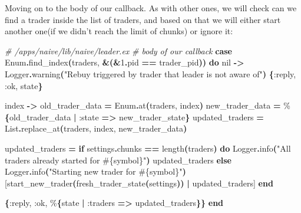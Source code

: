 \documentclass[
  oneside]{book}
\newenvironment{Shaded}{\begin{snugshade}}{\end{snugshade}}
\newcommand{\CommentTok}[1]{\textcolor[rgb]{0.56,0.35,0.01}{\textit{#1}}}
\newcommand{\ConstantTok}[1]{\textcolor[rgb]{0.56,0.35,0.01}{#1}}
\newcommand{\ControlFlowTok}[1]{\textcolor[rgb]{0.13,0.29,0.53}{\textbf{#1}}}
\newcommand{\DecValTok}[1]{\textcolor[rgb]{0.00,0.00,0.81}{#1}}
\newcommand{\FunctionTok}[1]{\textcolor[rgb]{0.13,0.29,0.53}{\textbf{#1}}}
\newcommand{\KeywordTok}[1]{\textcolor[rgb]{0.13,0.29,0.53}{\textbf{#1}}}
\newcommand{\NormalTok}[1]{#1}
\newcommand{\OperatorTok}[1]{\textcolor[rgb]{0.81,0.36,0.00}{\textbf{#1}}}
\newcommand{\OtherTok}[1]{\textcolor[rgb]{0.56,0.35,0.01}{#1}}
\newcommand{\StringTok}[1]{\textcolor[rgb]{0.31,0.60,0.02}{#1}}
\newcommand{\VariableTok}[1]{\textcolor[rgb]{0.00,0.00,0.00}{#1}}
\begin{document}
Moving on to the body of our callback. As with other ones, we will check can we find a trader inside the list of traders, and based on that we will either start another one(if we didn't reach the limit of chunks) or ignore it:

\begin{Shaded}
\begin{Highlighting}[]
    \CommentTok{\# /apps/naive/lib/naive/leader.ex}
    \CommentTok{\# body of our callback}
    \KeywordTok{case} \ConstantTok{Enum}\OperatorTok{.}\NormalTok{find\_index}\FunctionTok{(}\NormalTok{traders, }\OperatorTok{\&}\FunctionTok{(}\OperatorTok{\&}\DecValTok{1}\OperatorTok{.}\NormalTok{pid }\OperatorTok{==}\NormalTok{ trader\_pid}\FunctionTok{))} \KeywordTok{do}
      \ConstantTok{nil} \OperatorTok{{-}\textgreater{}}
        \ConstantTok{Logger}\OperatorTok{.}\NormalTok{warning}\FunctionTok{(}\StringTok{"Rebuy triggered by trader that leader is not aware of"}\FunctionTok{)}
        \FunctionTok{\{}\VariableTok{:reply}\NormalTok{, }\VariableTok{:ok}\NormalTok{, state}\FunctionTok{\}}

\NormalTok{      index }\OperatorTok{{-}\textgreater{}}
\NormalTok{        old\_trader\_data }\OperatorTok{=} \ConstantTok{Enum}\OperatorTok{.}\NormalTok{at}\FunctionTok{(}\NormalTok{traders, index}\FunctionTok{)}
\NormalTok{        new\_trader\_data }\OperatorTok{=}\NormalTok{ \%}\FunctionTok{\{}\NormalTok{old\_trader\_data }\OperatorTok{|} \VariableTok{:state} \OperatorTok{=\textgreater{}}\NormalTok{ new\_trader\_state}\FunctionTok{\}}
\NormalTok{        updated\_traders }\OperatorTok{=} \ConstantTok{List}\OperatorTok{.}\NormalTok{replace\_at}\FunctionTok{(}\NormalTok{traders, index, new\_trader\_data}\FunctionTok{)}

\NormalTok{        updated\_traders }\OperatorTok{=}
          \ControlFlowTok{if}\NormalTok{ settings}\OperatorTok{.}\NormalTok{chunks }\OperatorTok{==}\NormalTok{ length}\FunctionTok{(}\NormalTok{traders}\FunctionTok{)} \KeywordTok{do}
            \ConstantTok{Logger}\OperatorTok{.}\NormalTok{info}\FunctionTok{(}\StringTok{"All traders already started for }\OtherTok{\#\{}\NormalTok{symbol}\OtherTok{\}}\StringTok{"}\FunctionTok{)}
\NormalTok{            updated\_traders}
          \ControlFlowTok{else}
            \ConstantTok{Logger}\OperatorTok{.}\NormalTok{info}\FunctionTok{(}\StringTok{"Starting new trader for }\OtherTok{\#\{}\NormalTok{symbol}\OtherTok{\}}\StringTok{"}\FunctionTok{)}
            \OtherTok{[}\NormalTok{start\_new\_trader}\FunctionTok{(}\NormalTok{fresh\_trader\_state}\FunctionTok{(}\NormalTok{settings}\FunctionTok{))} \OperatorTok{|}\NormalTok{ updated\_traders}\OtherTok{]}
          \KeywordTok{end}

        \FunctionTok{\{}\VariableTok{:reply}\NormalTok{, }\VariableTok{:ok}\NormalTok{, \%}\FunctionTok{\{}\NormalTok{state }\OperatorTok{|} \VariableTok{:traders} \OperatorTok{=\textgreater{}}\NormalTok{ updated\_traders}\FunctionTok{\}\}}
    \KeywordTok{end}
\end{Highlighting}
\end{Shaded}
\end{document}
